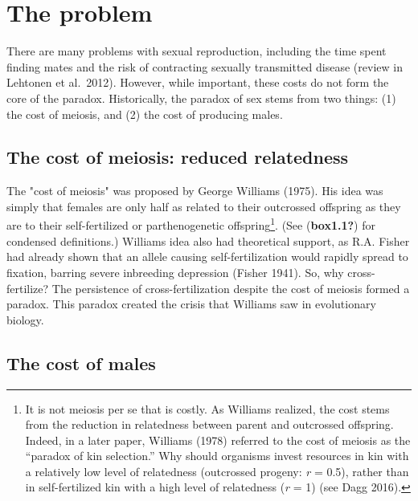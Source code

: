 \documentclass[
  11pt,
  letterpaper,
]{scrbook}
\begin{document}
\hypertarget{the-problem}{%
\section{The problem}\label{the-problem}}

There are many problems with sexual reproduction, including the time
spent finding mates and the risk of contracting sexually transmitted
disease (review in Lehtonen et al.~2012). However, while important,
these costs do not form the core of the paradox. Historically, the
paradox of sex stems from two things: (1) the cost of meiosis, and (2)
the cost of producing males.

\hypertarget{the-cost-of-meiosis-reduced-relatedness}{%
\subsection{The cost of meiosis: reduced
relatedness}\label{the-cost-of-meiosis-reduced-relatedness}}

The "cost of meiosis" was proposed by George Williams (1975). His idea
was simply that females are only half as related to their outcrossed
offspring as they are to their self-fertilized or parthenogenetic
offspring\footnote{It is not meiosis per se that is costly. As Williams
  realized, the cost stems from the reduction in relatedness between
  parent and outcrossed offspring. Indeed, in a later paper, Williams
  (1978) referred to the cost of meiosis as the ``paradox of kin
  selection.'' Why should organisms invest resources in kin with a
  relatively low level of relatedness (outcrossed progeny: \emph{r} =
  0.5), rather than in self-fertilized kin with a high level of
  relatedness (\emph{r} = 1) (see Dagg 2016).}. (See (\textbf{box1.1?})
for condensed definitions.) Williams\textquotesingle{} idea also had
theoretical support, as R.A. Fisher had already shown that an allele
causing self-fertilization would rapidly spread to fixation, barring
severe inbreeding depression (Fisher 1941). So, why cross-fertilize? The
persistence of cross-fertilization despite the cost of meiosis formed a
paradox. This paradox created the crisis that Williams saw in
evolutionary biology.

\hypertarget{the-cost-of-males}{%
\subsection{The cost of males}\label{the-cost-of-males}}
\end{document}
